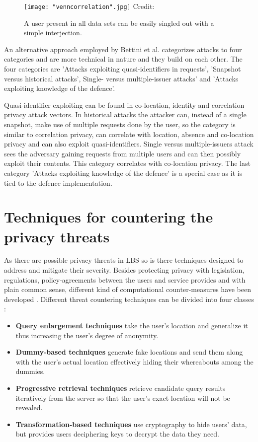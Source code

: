 \documentclass[english]{tktltiki2}
\theoremstyle{definition}
\theoremstyle{remark}
\begin{document}
\begin{figure}[ht!]
\centering
{}
\texttt{[image: "venncorrelation".jpg]}
\hbox{\scriptsize Credit:}
\caption{A user present in all data sets can be easily singled out with a simple interjection.}
\label{fig:venn}
\end{figure} 

An alternative approach employed by Bettini et al. categorizes attacks to four categories and are more technical in nature\cite{Bettini2009} and they build on each other. The four categories are 'Attacks exploiting quasi-identifiers in requests', 'Snapshot versus historical attacks', Single- versus multiple-issuer attacks' and 'Attacks exploiting knowledge of the defence'. \par
 Quasi-identifier exploiting can be found in co-location, identity and correlation privacy attack vectors. In historical attacks the attacker can, instead of a single snapshot, make use of multiple requests done by the user, so the category is similar to correlation privacy, can correlate with location, absence and co-location privacy and can also exploit quasi-identifiers. Single versus multiple-issuers attack sees the adversary gaining requests from multiple users and can then possibly exploit their contents. This category correlates with co-location privacy. The last category 'Attacks exploiting knowledge of the defence' is a special case as it is tied to the defence implementation.  


\section{Techniques for countering the privacy threats}


As there are possible privacy threats in LBS so is there techniques designed to address and mitigate their severity. Besides protecting privacy with legislation, regulations, policy-agreements between the users and service provides and with plain common sense, different kind of computational counter-measures have been developed \cite{Krumm2008}. Different threat countering techniques can be divided into four classes \cite{Krumm2008, Jensen2009}:
\begin{itemize}
\item \textbf{Query enlargement techniques} take the user's location and generalize it thus increasing the user's degree of anonymity. 
\item \textbf{Dummy-based techniques} generate fake locations and send them along with the user's actual location effectively hiding their whereabouts among the dummies.
\item \textbf{Progressive retrieval techniques} retrieve candidate query results iteratively from the server so that the user's exact location will not be revealed.
\pagebreak
\item \textbf{Transformation-based techniques} use cryptography to hide users' data, but provides users deciphering keys to decrypt the data they need. 
\end{itemize}
\end{document}

